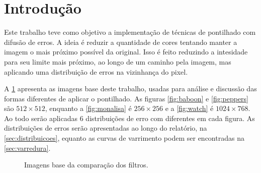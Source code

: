 \section{Introdução} \label{sec:intro}

Este trabalho teve como objetivo a implementação de técnicas de pontilhado com difusão de erros. A ideia é reduzir a quantidade de cores tentando manter a imagem o mais próximo possível da original. Isso é feito reduzindo a intesidade para seu limite mais próximo, ao longo de um caminho pela imagem, mas aplicando uma distribuição de erros na vizinhança do pixel.

A \cref{fig:base} apresenta as imagens base deste trabalho, usadas para análise e discussão das formas diferentes de aplicar o pontilhado. As figuras \ref{fig:baboon} e \ref{fig:peppers} são $512 \times 512$, enquanto a \cref{fig:monalisa} é $256 \times 256$ e a \cref{fig:watch} é $1024 \times 768$. Ao todo serão aplicadas 6 distribuições de erro com  diferentes em cada figura. As distribuições de erros serão apresentadas ao longo do relatório, na \cref{sec:distribuicoes}, equanto as curvas de varrimento podem ser encontradas na \cref{sec:varredura}.

\begin{figure}[H]
    \centering
    

    \caption{Imagens base da comparação dos filtros.}
    \label{fig:base}
\end{figure}
